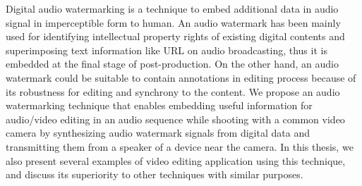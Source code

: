 \begin{eabstract}
Digital audio watermarking is a technique to embed additional data in audio signal in imperceptible form to human.
An audio watermark has been mainly used for identifying intellectual property rights of existing digital contents and superimposing text information like URL on audio broadcasting, thus it is embedded at the final stage of post-production.
On the other hand, an audio watermark could be suitable to contain annotations in editing process because of its robustness for editing and synchrony to the content.
We propose an audio watermarking technique that enables embedding useful information for audio/video editing in an audio sequence while shooting with a common video camera by synthesizing audio watermark signals from digital data and transmitting them from a speaker of a device near the camera.
In this thesis, we also present several examples of video editing application using this technique, and discuss its superiority to other techniques with similar purposes.
\end{eabstract}
